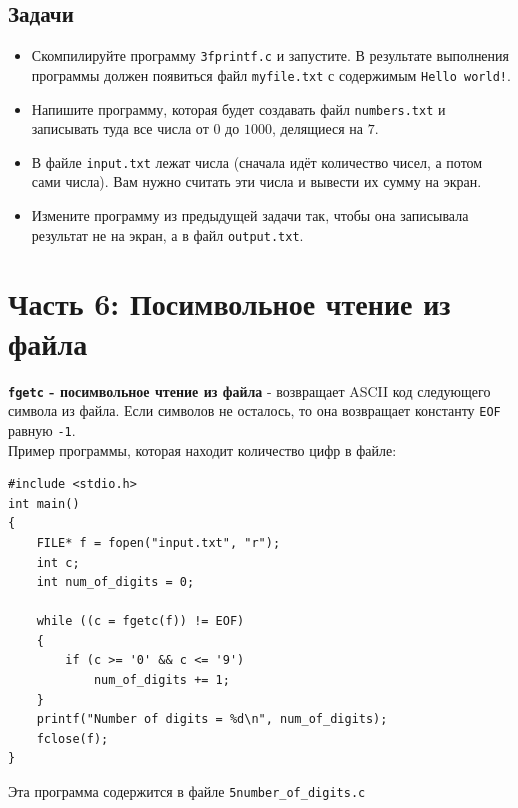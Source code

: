 \documentclass{article}
\begin{document}
\subsection*{Задачи}
\begin{itemize}
\item Скомпилируйте программу \texttt{3fprintf.c} и запустите. В результате выполнения программы должен появиться файл \texttt{myfile.txt} с содержимым \texttt{Hello world!}.

\item Напишите программу, которая будет создавать файл \texttt{numbers.txt} и записывать туда все числа от $0$ до $1000$, делящиеся на $7$.


\item В файле \texttt{input.txt} лежат числа (сначала идёт количество чисел, а потом сами числа). Вам нужно считать эти числа и вывести их сумму на экран.

\item Измените программу из предыдущей задачи так, чтобы она записывала результат не на экран, а в файл \texttt{output.txt}.
\end{itemize}



\newpage
\section*{Часть 6: Посимвольное чтение из файла}

\textbf{\texttt{fgetc} - посимвольное чтение из файла} - возвращает ASCII код следующего символа из файла. Если символов не осталось, то она возвращает константу \texttt{EOF} равную \texttt{-1}.\\
Пример программы, которая находит количество цифр в файле:
\begin{lstlisting}
#include <stdio.h>
int main() 
{
    FILE* f = fopen("input.txt", "r");
    int c; 
    int num_of_digits = 0;

    while ((c = fgetc(f)) != EOF) 
    {
        if (c >= '0' && c <= '9')
            num_of_digits += 1;
    }
    printf("Number of digits = %d\n", num_of_digits);
    fclose(f);
}
\end{lstlisting}
Эта программа содержится в файле \texttt{5number\_of\_digits.c}
\end{document}
